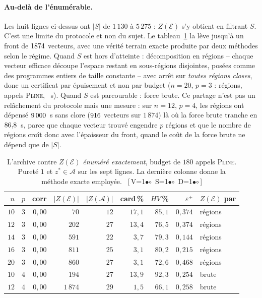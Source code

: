 \documentclass[11pt,a4paper]{article}
\theoremstyle{plain}
\theoremstyle{remark}
\newcommand{\Ecal}{\mathcal{E}}
\newcommand{\ILP}{\textsc{Pline}}
\newcommand{\Acal}{\mathcal{A}}
\newcommand{\cfgm}[1]{\ifnum#1=1$\bullet$\else$\circ$\fi}
\newcommand{\conf}[3]{%
  \textsf{\footnotesize[\,V\cfgm{#1}\ S\cfgm{#2}\ D\cfgm{#3}\,]}}
\begin{document}
\paragraph{Au-delà de l'énumérable.}
Les huit lignes ci-dessus ont $|S|$ de $1\,130$ à $5\,275$ : $Z(\Ecal)$ s'y
obtient en filtrant $S$. C'est une limite du protocole et non du sujet. Le
tableau~\ref{tab:livrablegrand} la lève jusqu'à un front de
$1874{}$ vecteurs, avec une vérité terrain exacte produite par deux
méthodes selon le régime. Quand $S$ est hors d'atteinte : décomposition en
régions -- chaque vecteur efficace découpe l'espace restant en sous-régions
disjointes, posées comme des programmes entiers de taille constante -- avec
arrêt sur \emph{toutes régions closes}, donc un certificat par épuisement et
non par budget ($n=20$, $p=3$ : \grandRegions{} régions,
\grandIlp{} appels \ILP, \grandSecondes{}~s). Quand $S$ est parcourable :
force brute. Ce partage n'est pas un relâchement du protocole mais une
mesure : sur $n=12$, $p=4$, les régions ont dépensé $9\,000{}$~s
sans clore ($916{}$ vecteurs sur $1\,874$) là où la force brute
tranche en $86{,}8{}$~s, parce que chaque vecteur trouvé engendre
$p$ régions et que le nombre de régions croît donc avec l'épaisseur du
front, quand le coût de la force brute ne dépend que de $|S|$.

\begin{table}[H]
\centering
\caption{L'archive contre $Z(\Ecal)$ \emph{énuméré exactement}, budget de
$180$ appels \ILP. Pureté $1$ et $z^\ast\in\Acal$ sur les sept lignes. La
dernière colonne donne la méthode exacte employée.\ \conf{1}{1}{1}}
\label{tab:livrablegrand}
\begin{tabular}{rrrrrrrrl}
\toprule
$n$ & $p$ & corr & $|Z(\Ecal)|$ & $|Z(\Acal)|$ &
card\,\% & $HV$\,\% & $\varepsilon^+$ & $Z(\Ecal)$ par\\
\midrule
$10$ & $3$ & $0{,}00$ & $70$    & $12$ & $17{,}1$ & $85{,}1$ & $0{,}374$ & régions\\
$12$ & $3$ & $0{,}00$ & $202$   & $27$ & $13{,}4$ & $76{,}5$ & $0{,}374$ & régions\\
$14$ & $3$ & $0{,}00$ & $591$   & $22$ & $3{,}7$  & $79{,}3$ & $0{,}144$ & régions\\
$16$ & $3$ & $0{,}00$ & $811$   & $25$ & $3{,}1$  & $80{,}2$ & $0{,}215$ & régions\\
$20$ & $3$ & $0{,}00$ & $860$   & $27$ & $3{,}1$  & $72{,}6$ & $0{,}468$ & régions\\
$10$ & $4$ & $0{,}00$ & $194$   & $27$ & $13{,}9$ & $92{,}3$ & $0{,}254$ & brute\\
$12$ & $4$ & $0{,}00$ & $1\,874$& $29$ & $1{,}5$  & $66{,}1$ & $0{,}258$ & brute\\
\bottomrule
\end{tabular}
\end{table}
\end{document}
